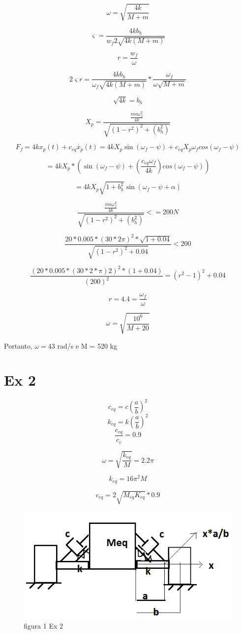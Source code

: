 \documentclass[a4paper, 12pt]{article}
\begin{document}
\[\omega=\sqrt{\frac{4k}{M+m}}\]

\[\varsigma=\frac{4kb_{h}}{w_f2\sqrt{4k(M+m)}}\] 
 
\[r=\frac{w_{f}}{\omega}\]


\[2\varsigma r= \frac{4kb_{h}}{\omega_{f}\sqrt{4k(M+m)}}*\frac{\omega_f}{\omega\sqrt{M+m}}  \]
 
\[{\sqrt{4k}} = b_{h}\]
 
\[X_{p}=\frac{\frac{ma\omega_f ^{2}}{4k}}{\sqrt{(1-r^{2})^{2}+(b_{h}^{2})}}\]
 
\[F_{f}=4kx_{p}(t)+c_{eq}\dot{x_{p}}(t)=4kX_{p}\sin(\omega_{f}-\psi)+c_{eq}X_{p}\omega_{f}cos(\omega_{f}-\psi)
\]
 
\[=4kX_{p}*(\sin(\omega_{f}-\psi)+(\frac{c_{eq}\omega_{f}}{4k})cos(\omega_{f}-\psi))\]
 
\[=4kX_{p}\sqrt{1+b_{h}^{2}}\sin(\omega_f-\psi+\alpha)\]

\[\frac{\frac{ma\omega_f ^{2}}{4k}}{\sqrt{(1-r^{2})^{2}+(b_{h}^{2})}} <= 200N\] 

\[\frac{20*0.005*(30*2\pi)^{2}*\sqrt{1+0.04}}{\sqrt{(1-r^{2})^{2}+0.04}}<200\]
 
\[\frac{(20*0.005*(30*2*\pi)2)^{2}*(1+0.04)}{(200)^{2}}=(r^{2}-1)^{2}+0.04\]
 
\[r = 4.4 = \frac{\omega_{f}}{\omega}\]
 

\[\omega = \sqrt{\frac{10^{6}}{M+20}}\] 

Portanto, $\omega=43$ rad/s e M = 520 kg

\section{Ex 2}

\[c_{eq} = c(\frac{a}{b})^{2}\]
\[k_{eq}= k(\frac{a}{b})^{2}\]
\[\frac{c_{eq}}{c_{c}}=0.9\] 

\[\omega=\sqrt{\frac{k_{eq}}{M}} = 2.2 \pi\]

\[k_{eq}=16 \pi^{2}M\]

\[c_{eq} = 2\sqrt{M_{eq}K_{eq}}*0.9\]


\begin{figure}[h]
\begin{center}
\includegraphics[scale=0.88]{./fig/2.png}
\caption{\label{fig:tur}figura 1 Ex 2} 
\end{center}
\end{figure}
\end{document}
